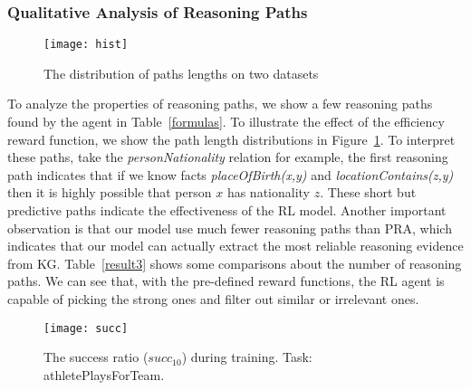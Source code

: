 \documentclass[11pt,letterpaper]{article}
\begin{document}
\subsubsection{Qualitative Analysis of Reasoning Paths}

\begin{figure}[t]
\centering
\texttt{[image: hist]}
\caption{The distribution of paths lengths on two datasets}
\label{hist}
\end{figure}

To analyze the properties of reasoning paths, we show a few reasoning paths found by the agent in Table~\ref{formulas}. To illustrate the effect of the efficiency reward function, we show the path length distributions in Figure~\ref{hist}. To interpret these paths, take the \textit{personNationality} relation for example, the first reasoning path indicates that if we know facts \textit{placeOfBirth(x,y)} and \textit{locationContains(z,y)} then it is highly possible that person $x$ has nationality $z$. These short but predictive paths indicate the effectiveness of the RL model. Another important observation is that our model use much fewer reasoning paths than PRA, which indicates that our model can actually extract the most reliable reasoning evidence from KG. Table~\ref{result3} shows some comparisons about the number of reasoning paths. We can see that, with the pre-defined reward functions, the RL agent is capable of picking the strong ones and filter out similar or irrelevant ones.


\begin{figure}[t]
\centering
\texttt{[image: succ]}
\caption{The success ratio ($succ_{10}$) during training. Task: athletePlaysForTeam.\footnotemark}
\label{stats1}
\end{figure}

\end{document}
